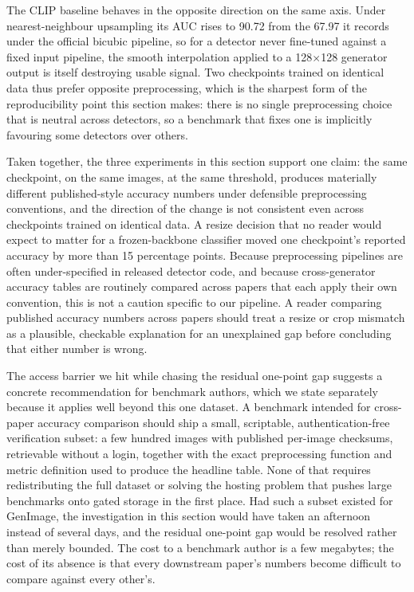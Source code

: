 \documentclass[3p,times,procedia]{elsarticle}
\begin{document}
The CLIP baseline behaves in the opposite direction on the same axis. Under
nearest-neighbour upsampling its AUC rises to 90.72 from the 67.97 it
records under the official bicubic pipeline, so for a detector never
fine-tuned against a fixed input pipeline, the smooth interpolation applied
to a 128$\times$128 generator output is itself destroying usable signal.
Two checkpoints trained on identical data thus prefer opposite
preprocessing, which is the sharpest form of the reproducibility point this
section makes: there is no single preprocessing choice that is neutral
across detectors, so a benchmark that fixes one is implicitly favouring
some detectors over others.

Taken together, the three experiments in this section support one claim:
the same checkpoint, on the same images, at the same threshold, produces
materially different published-style accuracy numbers under defensible
preprocessing conventions, and the direction of the change is not
consistent even across checkpoints trained on identical data. A resize
decision that no reader would expect to matter for a frozen-backbone
classifier moved one checkpoint's reported accuracy by more than 15
percentage points. Because preprocessing pipelines are often
under-specified in released detector code, and because cross-generator
accuracy tables are routinely compared across papers that each apply their
own convention, this is not a caution specific to our pipeline. A reader
comparing published accuracy numbers across papers should treat a
resize or crop mismatch as a plausible, checkable explanation for an
unexplained gap before concluding that either number is wrong.

The access barrier we hit while chasing the residual one-point gap suggests
a concrete recommendation for benchmark authors, which we state separately
because it applies well beyond this one dataset.
A benchmark intended for cross-paper accuracy comparison should ship a
small, scriptable, authentication-free verification subset: a few hundred
images with published per-image checksums, retrievable without a login,
together with the exact preprocessing function and metric definition used
to produce the headline table. None of that requires redistributing the
full dataset or solving the hosting problem that pushes large benchmarks
onto gated storage in the first place. Had such a subset existed for
GenImage, the investigation in this section would have taken an afternoon
instead of several days, and the residual one-point gap would be resolved
rather than merely bounded. The cost to a benchmark author is a few
megabytes; the cost of its absence is that every downstream paper's numbers
become difficult to compare against every other's.
\end{document}
